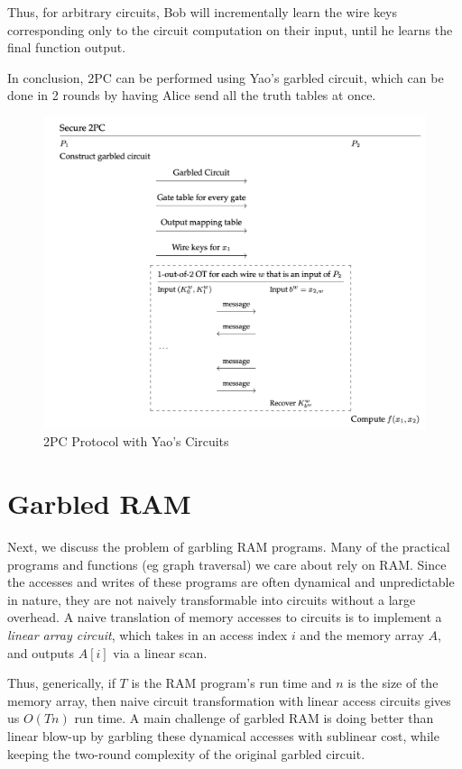 Thus, for arbitrary circuits, Bob will incrementally learn the wire keys corresponding only to the circuit computation on their input, until he learns the final function output.

In conclusion, 2PC can be performed using Yao's garbled circuit, which can be done in 2 rounds by having Alice send all the truth tables at once. 
\begin{figure}
    \centering
    \includegraphics[scale=0.45]{2pc.png}
    \caption{2PC Protocol with Yao's Circuits}
    \label{fig:yao}
\end{figure}
\section{Garbled RAM}
Next, we discuss the problem of garbling RAM programs.
Many of the practical programs and functions (eg graph traversal) we care about rely on RAM. Since the accesses and writes of these programs are often dynamical and unpredictable in nature, they are not naively transformable into circuits without a large overhead. A naive translation of memory accesses to circuits is to implement a \textit{linear array circuit}, which takes in an access index $i$ and the memory array $A$, and outputs $A[i]$ via a linear scan. 

Thus, generically, if $T$ is the RAM program's run time and $n$ is the size of the memory array, then naive circuit transformation with linear access circuits gives us $O(Tn)$ run time. A main challenge of garbled RAM is doing better than linear blow-up by garbling these dynamical accesses with sublinear cost, while keeping the two-round complexity of the original garbled circuit. 

